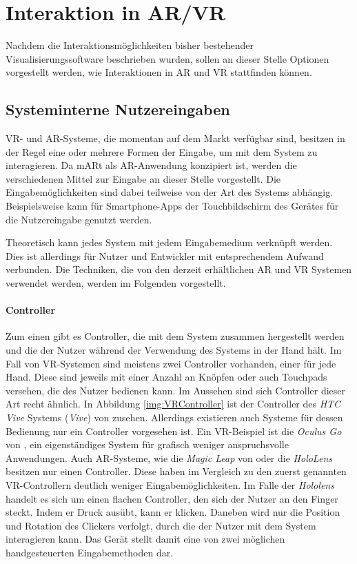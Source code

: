 \section{Interaktion in AR/VR}	
\label{VRInteraktion}							 %

Nachdem die Interaktionsmöglichkeiten bisher bestehender Visualisierungssoftware beschrieben wurden, sollen an dieser Stelle Optionen vorgestellt werden, wie Interaktionen in AR und VR stattfinden können. 

\subsection{Systeminterne Nutzereingaben}

VR- und AR-Systeme, die momentan auf dem Markt verfügbar sind, besitzen in der Regel  eine oder mehrere Formen der Eingabe, um mit dem System zu interagieren. Da mARt als AR-Anwendung konzipiert ist, werden die verschiedenen Mittel zur Eingabe an dieser Stelle vorgestellt.
Die Eingabemöglichkeiten sind dabei teilweise von der Art des Systems abhängig. 
Beispielsweise kann für Smartphone-Apps der Touchbildschirm des Gerätes für die Nutzereingabe genutzt werden. 

Theoretisch kann jedes System mit jedem Eingabemedium verknüpft werden. Dies ist allerdings für Nutzer und Entwickler mit entsprechendem Aufwand verbunden. Die Techniken, die von den derzeit erhältlichen AR und VR Systemen verwendet werden, werden im Folgenden vorgestellt.

\paragraph{Controller}
Zum einen gibt es Controller, die mit dem System zusammen hergestellt werden und die der Nutzer während der Verwendung des Systems in der Hand hält. Im Fall von VR-Systemen sind meistens zwei Controller vorhanden, einer für jede Hand. Diese sind jeweils mit einer Anzahl an Knöpfen oder auch Touchpads versehen, die des Nutzer bedienen kann. Im Aussehen sind sich Controller dieser Art recht ähnlich. In Abbildung \ref{img:VRController} ist der Controller des \textit{HTC Vive} Systems (\textit{Vive}) von \cite{vive} zusehen.
Allerdings existieren auch Systeme für dessen Bedienung nur ein Controller vorgesehen ist. Ein VR-Beispiel ist die \textit{Oculus Go} von \cite{oculus}, ein eigenständiges System für grafisch weniger anspruchsvolle Anwendungen. 
Auch AR-Systeme, wie die \textit{Magic Leap} von \cite{magicLeap} oder die \textit{HoloLens} besitzen nur einen Controller. Diese haben im Vergleich zu den zuerst genannten VR-Controllern deutlich weniger Eingabemöglichkeiten. Im Falle der \textit{Hololens} handelt es sich um einen flachen Controller, den sich der Nutzer an den Finger steckt. Indem er Druck ausübt, kann er klicken. Daneben wird nur die Position und Rotation des Clickers verfolgt, durch die der Nutzer mit dem System interagieren kann. Das Gerät stellt damit eine von zwei möglichen handgesteuerten Eingabemethoden dar. 

